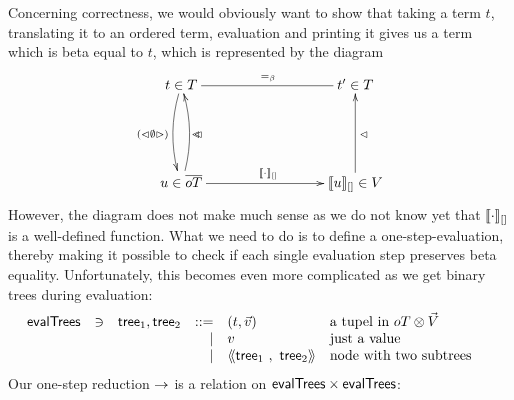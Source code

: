 \documentclass[submission,copyright,creativecommons]{eptcs}
\begin{document}
%

Concerning correctness, we would obviously want to show that taking a term $t$, translating it to an ordered term, evaluation and printing it gives us a term which is beta equal to $t$, which is represented by the diagram
\[
\begin{xy}
\xymatrix{
 t \in \te \ar@{-}[rrr]^{=_\beta} \ar@/_/[dd]_{\parseFun \emptySet} & & & t' \in \te \\ 
 \\
 u \in \otc \ar@/_/[uu]_{\prE                  } \ar[rrr]^{\ev{\cdot}{\emptyVec}} & & & \ev{u}{\emptyVec} \in \va \ar[uu]_{\prValE}
}
\end{xy}
\]
However, the diagram does not make much sense as we do not know yet that $\llbracket{\cdot}\rrbracket_{[]}$ is a well-defined function.
What we need to do is to define a one-step-evaluation, thereby making it possible to check if each single evaluation step preserves beta equality. Unfortunately, this becomes even more complicated as we get binary trees during evaluation: 
\[
\begin{array}{lllrll@{\qquad}}
\evTr       & \ni & \mathsf{tree}_1, \mathsf{tree}_2 & ::= & (t, \vec v) & \mbox{a tupel in $\ot \otimes \vl$} \\
			                   &&& \mid & v & \mbox{just a value} \\
			                   &&& \mid & \tree {\mathsf{tree}_1} {\mathsf{tree}_2}  & \mbox{node with two subtrees} 
\end{array}
\]
Our one-step reduction $\rightarrow$ is a relation on $\mathsf{evalTrees} \times \mathsf{evalTrees}$:
\end{document}
